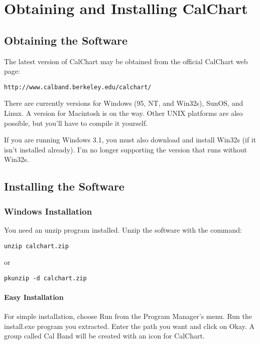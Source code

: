 \chapter{Obtaining and Installing CalChart}\label{software}

\section{Obtaining the Software}\label{obtaining}

The latest version of CalChart may be obtained from the official
CalChart web page:

\begin{verbatim}
http://www.calband.berkeley.edu/calchart/
\end{verbatim}

There are currently versions for Windows (95, NT, and Win32s), SunOS,
and Linux.  A version for Macintosh is on the way.  Other UNIX platforms
are also possible, but you'll have to compile it yourself.

If you are running Windows 3.1, you must also download and install
Win32s (if it isn't installed already).  I'm no longer supporting the
version that runs without Win32s.

\section{Installing the Software}\label{installing}

\subsection{Windows Installation}\label{wininstall}

You need an unzip program installed.  Unzip the software with the
command:

\begin{verbatim}
unzip calchart.zip
\end{verbatim}
or
\begin{verbatim}
pkunzip -d calchart.zip
\end{verbatim}

\subsubsection{Easy Installation}\label{easyinstall}

For simple installation, choose Run from the Program Manager's menu.
Run the install.exe program you extracted.  Enter the path you want and
click on Okay.  A group called Cal Band will be created with an icon for
CalChart.

